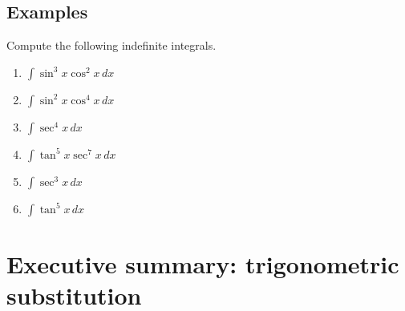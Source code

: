 \subsection*{Examples}
Compute the following indefinite integrals.
\begin{enumerate}
  \item $\displaystyle \int \sin^3x \cos^2 x\, dx$
  \item $\displaystyle \int \sin^2 x\cos^4 x\, dx$
  \item $\displaystyle \int \sec^4 x\, dx$
  \item $\displaystyle \int \tan^5 x\sec^7 x\, dx$
  \item $\displaystyle \int \sec^3 x\, dx$
  \item $\displaystyle \int \tan^5 x \, dx$

\end{enumerate}




\newpage

\section{Executive summary: trigonometric substitution}

\thispagestyle{fancy}





